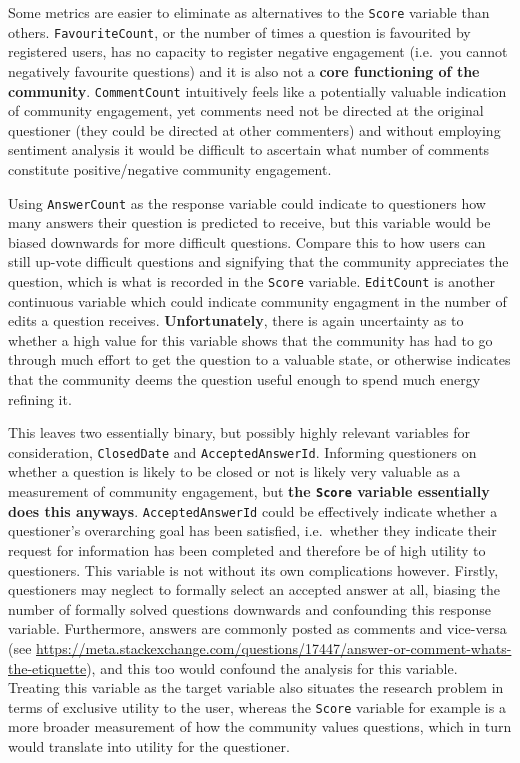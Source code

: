 \documentclass[11pt,preprint, authoryear]{article}
\numberwithin{equation}{section}
\begin{document}
Some metrics are easier to eliminate as alternatives to the
\texttt{Score} variable than others. \texttt{FavouriteCount}, or the
number of times a question is favourited by registered users, has no
capacity to register negative engagement (i.e.~you cannot negatively
favourite questions) and it is also not a \textbf{core functioning of
the community}. \texttt{CommentCount} intuitively feels like a
potentially valuable indication of community engagement, yet comments
need not be directed at the original questioner (they could be directed
at other commenters) and without employing sentiment analysis it would
be difficult to ascertain what number of comments constitute
positive/negative community engagement.

Using \texttt{AnswerCount} as the response variable could indicate to
questioners how many answers their question is predicted to receive, but
this variable would be biased downwards for more difficult questions.
Compare this to how users can still up-vote difficult questions and
signifying that the community appreciates the question, which is what is
recorded in the \texttt{Score} variable. \texttt{EditCount} is another
continuous variable which could indicate community engagment in the
number of edits a question receives. \textbf{Unfortunately}, there is
again uncertainty as to whether a high value for this variable shows
that the community has had to go through much effort to get the question
to a valuable state, or otherwise indicates that the community deems the
question useful enough to spend much energy refining it.

This leaves two essentially binary, but possibly highly relevant
variables for consideration, \texttt{ClosedDate} and
\texttt{AcceptedAnswerId}. Informing questioners on whether a question
is likely to be closed or not is likely very valuable as a measurement
of community engagement, but \textbf{the \texttt{Score} variable
essentially does this anyways}. \texttt{AcceptedAnswerId} could be
effectively indicate whether a questioner's overarching goal has been
satisfied, i.e.~whether they indicate their request for information has
been completed and therefore be of high utility to questioners. This
variable is not without its own complications however. Firstly,
questioners may neglect to formally select an accepted answer at all,
biasing the number of formally solved questions downwards and
confounding this response variable. Furthermore, answers are commonly
posted as comments and vice-versa (see
\url{https://meta.stackexchange.com/questions/17447/answer-or-comment-whats-the-etiquette}),
and this too would confound the analysis for this variable. Treating
this variable as the target variable also situates the research problem
in terms of exclusive utility to the user, whereas the \texttt{Score}
variable for example is a more broader measurement of how the community
values questions, which in turn would translate into utility for the
questioner.
\end{document}
